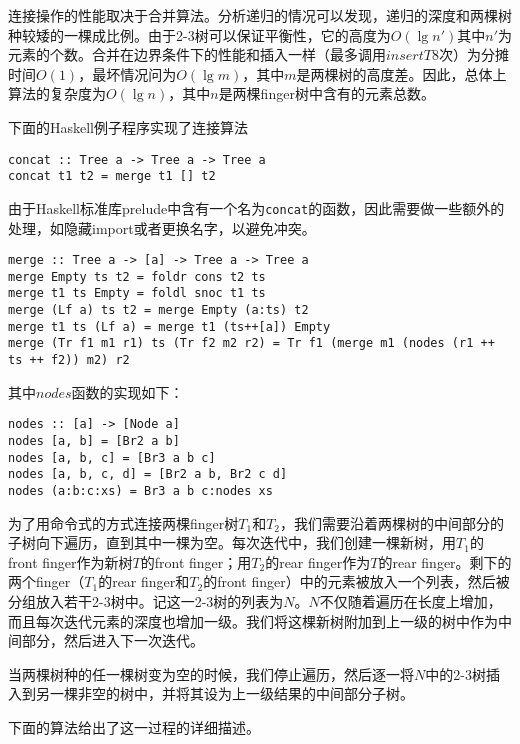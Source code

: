 \documentclass[UTF8]{article}
\begin{document}
连接操作的性能取决于合并算法。分析递归的情况可以发现，递归的深度和两棵树种较矮的一棵成比例。由于2-3树可以保证平衡性，它的高度为$O(\lg n')$其中$n'$为元素的个数。合并在边界条件下的性能和插入一样（最多调用$insertT$8次）为分摊时间$O(1)$，最坏情况问为$O(\lg m)$，其中$m$是两棵树的高度差。因此，总体上算法的复杂度为$O(\lg n)$，其中$n$是两棵finger树中含有的元素总数。

下面的Haskell例子程序实现了连接算法

\lstset{language=Haskell}
\begin{lstlisting}[style=Haskell]
concat :: Tree a -> Tree a -> Tree a
concat t1 t2 = merge t1 [] t2
\end{lstlisting}

由于Haskell标准库prelude中含有一个名为\texttt{concat}的函数，因此需要做一些额外的处理，如隐藏import或者更换名字，以避免冲突。

\begin{lstlisting}[style=Haskell]
merge :: Tree a -> [a] -> Tree a -> Tree a
merge Empty ts t2 = foldr cons t2 ts
merge t1 ts Empty = foldl snoc t1 ts
merge (Lf a) ts t2 = merge Empty (a:ts) t2
merge t1 ts (Lf a) = merge t1 (ts++[a]) Empty
merge (Tr f1 m1 r1) ts (Tr f2 m2 r2) = Tr f1 (merge m1 (nodes (r1 ++ ts ++ f2)) m2) r2
\end{lstlisting}

其中$nodes$函数的实现如下：

\begin{lstlisting}[style=Haskell]
nodes :: [a] -> [Node a]
nodes [a, b] = [Br2 a b]
nodes [a, b, c] = [Br3 a b c]
nodes [a, b, c, d] = [Br2 a b, Br2 c d]
nodes (a:b:c:xs) = Br3 a b c:nodes xs
\end{lstlisting}

为了用命令式的方式连接两棵finger树$T_1$和$T_2$，我们需要沿着两棵树的中间部分的子树向下遍历，直到其中一棵为空。每次迭代中，我们创建一棵新树，用$T_1$的front finger作为新树$T$的front finger；用$T_2$的rear finger作为$T$的rear finger。剩下的两个finger（$T_1$的rear finger和$T_2$的front finger）中的元素被放入一个列表，然后被分组放入若干2-3树中。记这一2-3树的列表为$N$。$N$不仅随着遍历在长度上增加，而且每次迭代元素的深度也增加一级。我们将这棵新树附加到上一级的树中作为中间部分，然后进入下一次迭代。

当两棵树种的任一棵树变为空的时候，我们停止遍历，然后逐一将$N$中的2-3树插入到另一棵非空的树中，并将其设为上一级结果的中间部分子树。

下面的算法给出了这一过程的详细描述。
\end{document}
